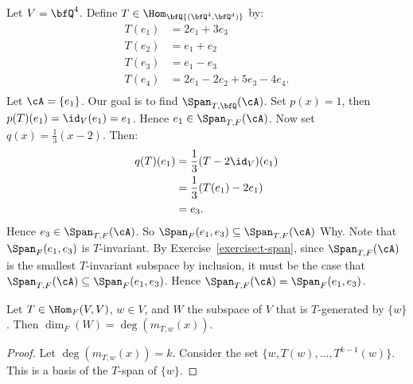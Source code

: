     \begin{example}
        Let $V = \bfQ^4$. Define $T \in \Hom_\bfQ{(\bfQ^4,\bfQ^4)}$ by:
            \begin{equation*}
            \begin{split}
                T(e_1) &= 2e_1 + 3e_3 \\
                T(e_2) &= e_1 + e_2 \\
                T(e_3) &= e_1 - e_3 \\
                T(e_4) &= 2e_1 - 2e_2 + 5e_3 - 4e_4.\\
            \end{split}
            \end{equation*}
        Let $\cA = \{e_1\}$. Our goal is to find $\Span_{T,\bfQ}(\cA)$. Set $p(x) = 1$, then $p(T)(e_1) = \id_V(e_1) =e_1$. Hence $e_1 \in \Span_{T,F}(\cA)$. Now set $q(x) = \frac{1}{3}(x-2)$. Then:
            \begin{equation*}
            \begin{split}
                q(T)(e_1)
                & = \frac{1}{3}(T-2\id_V)(e_1)\\
                & = \frac{1}{3}(T(e_1) - 2e_1) \\
                & = e_3.
            \end{split}
            \end{equation*}
        Hence $e_3 \in \Span_{T,F}(\cA)$. So $\Span_F{(e_1,e_3)} \subseteq \Span_{T,F}(\cA)$ {\color{red} Why}. Note that $\Span_F(e_1,e_3)$ is $T$-invariant. By Exercise~\ref{exercise:t-span}, since $\Span_{T,F}(\cA)$ is the smallest $T$-invariant subspace by inclusion, it must be the case that $\Span_{T,F}(\cA) \subseteq \Span_F{(e_1,e_3)}$. Hence $\Span_{T,F}(\cA) = \Span_F{(e_1,e_3)}$.
    \end{example}

    \begin{lemma}\label{lemma:4.3.9}
        Let $T \in \Hom_F{(V,V)}$, $w \in V$, and $W$ the subspace of $V$ that is $T$-generated by $\{w\}$. Then $\dim_F{(W)} = \deg(m_{T,w}(x))$.
    \end{lemma}
        \begin{proof}
            Let $\deg(m_{T,w}(x)) = k$. Consider the set $\{w,T(w),...,T^{k-1}(w)\}$. This is a basis of the $T$-span of $\{w\}$.
        \end{proof}

